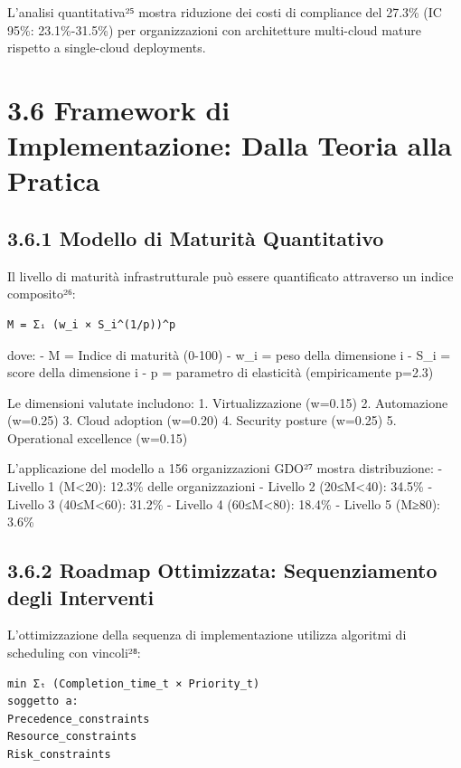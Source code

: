 \documentclass[12pt,a4paper,oneside]{book}
\numberwithin{figure}{chapter} %
\numberwithin{table}{chapter}  %
\begin{document}
L'analisi quantitativa²⁵ mostra riduzione dei costi di compliance del
27.3\% (IC 95\%: 23.1\%-31.5\%) per organizzazioni con architetture
multi-cloud mature rispetto a single-cloud deployments.

\section{3.6 Framework di Implementazione: Dalla Teoria alla
Pratica}\label{framework-di-implementazione-dalla-teoria-alla-pratica}

\subsection{3.6.1 Modello di Maturità
Quantitativo}\label{modello-di-maturituxe0-quantitativo}

Il livello di maturità infrastrutturale può essere quantificato
attraverso un indice composito²⁶:

\begin{verbatim}
M = Σᵢ (w_i × S_i^(1/p))^p
\end{verbatim}

dove: - M = Indice di maturità (0-100) - w\_i = peso della dimensione i
- S\_i = score della dimensione i - p = parametro di elasticità
(empiricamente p=2.3)

Le dimensioni valutate includono: 1. Virtualizzazione (w=0.15) 2.
Automazione (w=0.25) 3. Cloud adoption (w=0.20) 4. Security posture
(w=0.25) 5. Operational excellence (w=0.15)

L'applicazione del modello a 156 organizzazioni GDO²⁷ mostra
distribuzione: - Livello 1 (M\textless20): 12.3\% delle organizzazioni -
Livello 2 (20≤M\textless40): 34.5\% - Livello 3 (40≤M\textless60):
31.2\% - Livello 4 (60≤M\textless80): 18.4\% - Livello 5 (M≥80): 3.6\%

\subsection{3.6.2 Roadmap Ottimizzata: Sequenziamento degli
Interventi}\label{roadmap-ottimizzata-sequenziamento-degli-interventi}

L'ottimizzazione della sequenza di implementazione utilizza algoritmi di
scheduling con vincoli²⁸:

\begin{verbatim}
min Σₜ (Completion_time_t × Priority_t)
soggetto a:
Precedence_constraints
Resource_constraints
Risk_constraints
\end{verbatim}
\end{document}
